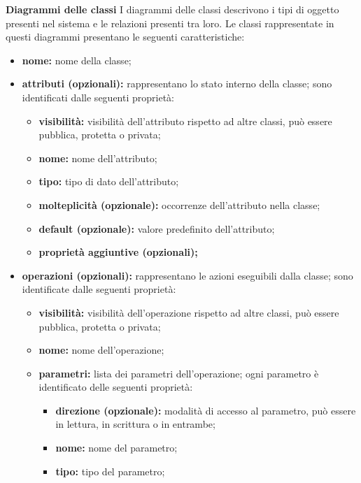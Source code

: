 						\textbf{Diagrammi delle classi}
						\newline
						\newline
						I diagrammi delle classi descrivono i tipi di oggetto presenti nel sistema e le relazioni presenti tra loro.
						\newline
						Le classi rappresentate in questi diagrammi presentano le seguenti caratteristiche:
						\begin{itemize}
							\item \textbf{nome:} nome della classe;
							\item \textbf{attributi (opzionali):} rappresentano lo stato interno della classe; sono identificati dalle seguenti proprietà:
							\begin{itemize}
								\item \textbf{visibilità:} visibilità dell'attributo rispetto ad altre classi, può essere pubblica, protetta o privata;
								\item \textbf{nome:} nome dell'attributo;
								\item \textbf{tipo:} tipo di dato dell'attributo;
								\item \textbf{molteplicità (opzionale):} occorrenze dell'attributo nella classe;
								\item \textbf{default (opzionale):} valore predefinito dell'attributo;
								\item \textbf{proprietà aggiuntive (opzionali);}
							\end{itemize} 
							\item \textbf{operazioni (opzionali):} rappresentano le azioni eseguibili dalla classe; sono identificate dalle seguenti proprietà:
							\begin{itemize}
								\item \textbf{visibilità:} visibilità dell'operazione rispetto ad altre classi, può essere pubblica, protetta o privata;
								\item \textbf{nome:} nome dell'operazione;
								\item \textbf{parametri:} lista dei parametri dell'operazione; ogni parametro è identificato delle seguenti proprietà:
								\begin{itemize}
									\item \textbf{direzione (opzionale):} modalità di accesso al parametro, può essere in lettura, in scrittura o in entrambe;
									\item \textbf{nome:} nome del parametro;
									\item \textbf{tipo:} tipo del parametro;

\end{itemize}
\end{itemize}
\end{itemize}
